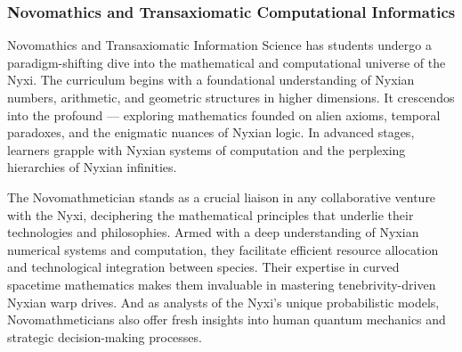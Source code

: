 \subsubsection{Novomathics and Transaxiomatic Computational Informatics}
Novomathics and Transaxiomatic Information Science has students undergo a
paradigm-shifting dive into the mathematical and computational universe of the
Nyxi. The curriculum begins with a foundational understanding of Nyxian
numbers, arithmetic, and geometric structures in higher dimensions. It
crescendos into the profound — exploring mathematics founded on alien axioms,
temporal paradoxes, and the enigmatic nuances of Nyxian logic. In advanced
stages, learners grapple with Nyxian systems of computation and the perplexing
hierarchies of Nyxian infinities.

The Novomathmetician stands as a crucial liaison in any collaborative venture
with the Nyxi, deciphering the mathematical principles that underlie their
technologies and philosophies. Armed with a deep understanding of Nyxian
numerical systems and computation, they facilitate efficient resource
allocation and technological integration between species. Their expertise in
curved spacetime mathematics makes them invaluable in mastering
tenebrivity-driven Nyxian warp drives. And as analysts of the Nyxi's unique
probabilistic models, Novomathmeticians also offer fresh insights into human
quantum mechanics and strategic decision-making processes.

